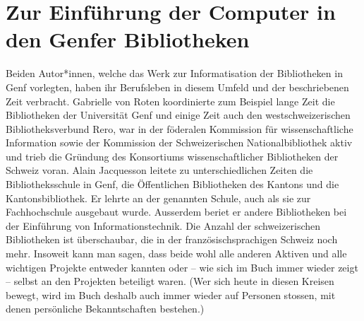 \documentclass[a4paper,
fontsize=11pt,
oneside,
numbers=noperiodatend,
parskip=half-,
bibliography=totoc,
final
]{scrartcl}
\begin{document}
\hypertarget{zur-einfuxfchrung-der-computer-in-den-genfer-bibliotheken}{%
\section{Zur Einführung der Computer in den Genfer
Bibliotheken}\label{zur-einfuxfchrung-der-computer-in-den-genfer-bibliotheken}}

Beiden Autor*innen, welche das Werk zur Informatisation der Bibliotheken
in Genf vorlegten, haben ihr Berufsleben in diesem Umfeld und der
beschriebenen Zeit verbracht. Gabrielle von Roten koordinierte zum
Beispiel lange Zeit die Bibliotheken der Universität Genf und einige
Zeit auch den westschweizerischen Bibliotheksverbund Rero, war in der
föderalen Kommission für wissenschaftliche Information sowie der
Kommission der Schweizerischen Nationalbibliothek aktiv und trieb die
Gründung des Konsortiums wissenschaftlicher Bibliotheken der Schweiz
voran. Alain Jacquesson leitete zu unterschiedlichen Zeiten die
Bibliotheksschule in Genf, die Öffentlichen Bibliotheken des Kantons und
die Kantonsbibliothek. Er lehrte an der genannten Schule, auch als sie
zur Fachhochschule ausgebaut wurde. Ausserdem beriet er andere
Bibliotheken bei der Einführung von Informationstechnik. Die Anzahl der
schweizerischen Bibliotheken ist überschaubar, die in der
französischsprachigen Schweiz noch mehr. Insoweit kann man sagen, dass
beide wohl alle anderen Aktiven und alle wichtigen Projekte entweder
kannten oder -- wie sich im Buch immer wieder zeigt -- selbst an den
Projekten beteiligt waren. (Wer sich heute in diesen Kreisen bewegt,
wird im Buch deshalb auch immer wieder auf Personen stossen, mit denen
persönliche Bekanntschaften bestehen.)
\end{document}
